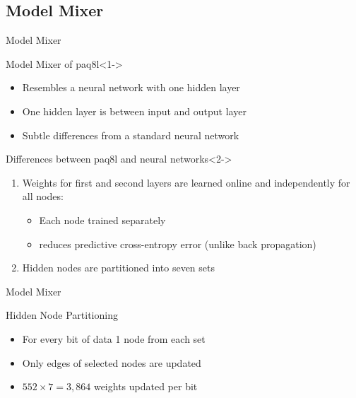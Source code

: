 \documentclass[11pt,usenames,dvipsnames]{beamer}
\begin{document}
\subsection{Model Mixer}
\begin{frame}{Model Mixer}
	\begin{exampleblock}{Model Mixer of paq8l}<1->
		\begin{itemize}
			\item Resembles a neural network with one hidden layer
			\item One hidden layer is between input and output layer
			\item Subtle differences from a standard neural network
		\end{itemize}
	\end{exampleblock}
	
	\begin{block}{Differences between paq8l and neural networks}<2->
		\begin{enumerate}
			\item Weights for first and second layers are learned online and independently for all nodes:
			\begin{itemize}
				\item Each node trained separately 
				\item reduces predictive cross-entropy error (unlike back propagation)
			\end{itemize}	
			\item Hidden nodes are partitioned into seven sets		 
		\end{enumerate}
	\end{block}
\end{frame}

\begin{frame}{Model Mixer}
	\begin{exampleblock}{Hidden Node Partitioning}
		\begin{itemize}
			\item For every bit of data 1 node from each set
			\item Only edges of selected nodes are updated
			\item $552\times 7 = 3,864$ weights updated per bit
		\end{itemize}
	\end{exampleblock}

\end{frame}
\end{document}
